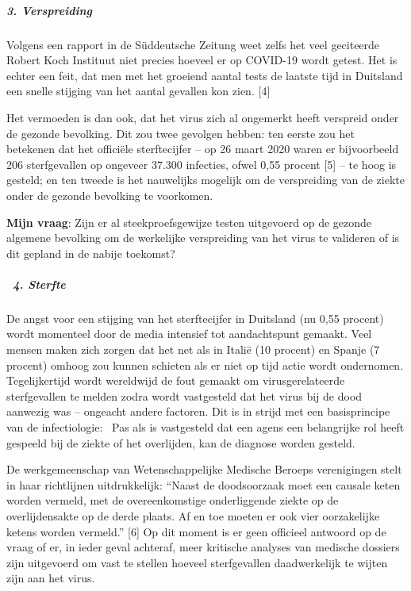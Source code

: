 \hypertarget{3-verspreiding}{%
\subparagraph{\texorpdfstring{\textbf{3.
Verspreiding}}{3. Verspreiding}}\label{3-verspreiding}}

Volgens een rapport in de Süddeutsche Zeitung weet zelfs het veel
geciteerde Robert Koch Instituut niet precies hoeveel er op COVID-19
wordt getest. Het is echter een feit, dat men met het groeiend aantal
tests de laatste tijd in Duitsland een snelle stijging van het aantal
gevallen kon zien. {[}4{]}

Het vermoeden is dan ook, dat het virus zich al ongemerkt heeft
verspreid onder de gezonde bevolking. Dit zou twee gevolgen hebben: ten
eerste zou het betekenen dat het officiële sterftecijfer -- op 26 maart
2020 waren er bijvoorbeeld 206 sterfgevallen op ongeveer 37.300
infecties, ofwel 0,55 procent {[}5{]} -- te hoog is gesteld; en ten
tweede is het nauwelijks mogelijk om de verspreiding van de ziekte onder
de gezonde bevolking te voorkomen.

\textbf{Mijn vraag}: Zijn er al steekproefsgewijze testen uitgevoerd op
de gezonde algemene bevolking om de werkelijke verspreiding van het
virus te valideren of is dit gepland in de nabije toekomst?

\hypertarget{-4-sterfte}{%
\subparagraph{\texorpdfstring{\textbf{~4.
Sterfte}}{~4. Sterfte}}\label{-4-sterfte}}

De angst voor een stijging van het sterftecijfer in Duitsland (nu 0,55
procent) wordt momenteel door de media intensief tot aandachtspunt
gemaakt. Veel mensen maken zich zorgen dat het net als in Italië (10
procent) en Spanje (7 procent) omhoog zou kunnen schieten als er niet op
tijd actie wordt ondernomen. Tegelijkertijd wordt wereldwijd de fout
gemaakt om virusgerelateerde sterfgevallen te melden zodra wordt
vastgesteld dat het virus bij de dood aanwezig was -- ongeacht andere
factoren. Dit is in strijd met een basisprincipe van de infectiologie:~
Pas als is vastgesteld dat een agens een belangrijke rol heeft gespeeld
bij de ziekte of het overlijden, kan de diagnose worden gesteld.

De werkgemeenschap van Wetenschappelijke Medische Beroeps verenigingen
stelt in haar richtlijnen uitdrukkelijk: ``Naast de doodsoorzaak moet
een causale keten worden vermeld, met de overeenkomstige onderliggende
ziekte op de overlijdensakte op de derde plaats. Af en toe moeten er ook
vier oorzakelijke ketens worden vermeld.'' {[}6{]} Op dit moment is er
geen officieel antwoord op de vraag of er, in ieder geval achteraf, meer
kritische analyses van medische dossiers zijn uitgevoerd om vast te
stellen hoeveel sterfgevallen daadwerkelijk te wijten zijn aan het
virus.

